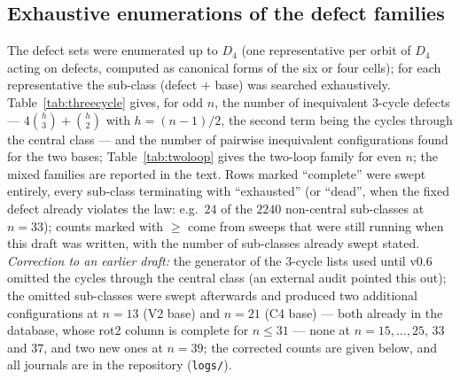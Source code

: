 \documentclass[11pt]{article}
\theoremstyle{remark}
\newcommand{\Dfour}{D_4}
\begin{document}
\subsection{Exhaustive enumerations of the defect families}
The defect sets were enumerated up to $\Dfour$ (one representative per orbit of $\Dfour$ acting on defects, computed as
canonical forms of the six or four cells); for each representative the sub-class (defect $+$ base) was searched exhaustively.
Table~\ref{tab:threecycle} gives, for odd $n$, the number of inequivalent $3$-cycle defects --- $4\binom h3+\binom h2$ with
$h=(n-1)/2$, the second term being the cycles through the central class --- and the number of pairwise inequivalent
configurations found for the two bases; Table~\ref{tab:twoloop} gives the two-loop family for even $n$; the mixed families
are reported in the text.  Rows marked ``complete'' were swept entirely, every sub-class terminating with ``exhausted''
(or ``dead'', when the fixed defect already violates the law: e.g.\ $24$ of the $2240$ non-central sub-classes at $n=33$);
counts marked with $\ge$ come from sweeps that were still running when this draft was written, with the number of
sub-classes already swept stated.  \emph{Correction to an earlier draft:} the generator of the $3$-cycle lists used until
v0.6 omitted the cycles through the central class (an external audit pointed this out); the omitted sub-classes were swept
afterwards and produced two additional configurations at $n=13$ (V2 base) and $n=21$ (C4 base) --- both already in the
database, whose rot2 column is complete for $n\le31$ --- none at $n=15,\dots,25$, $33$ and $37$, and two new ones at $n=39$; the corrected counts are
given below, and all journals are in the repository (\texttt{logs/}).
\end{document}
